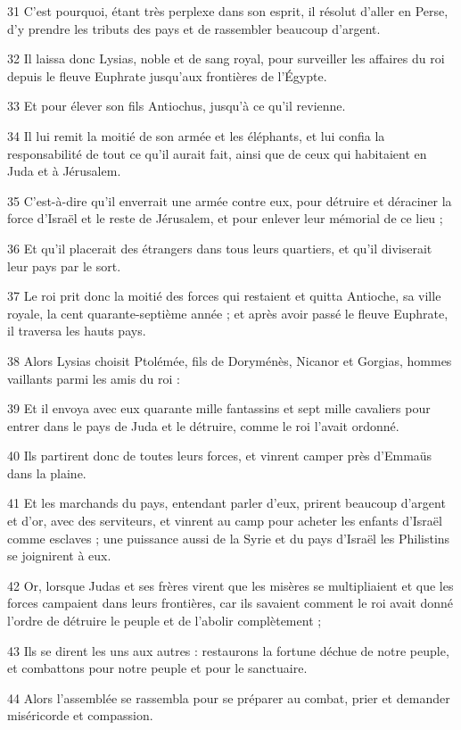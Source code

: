 \par 31 C'est pourquoi, étant très perplexe dans son esprit, il résolut d'aller en Perse, d'y prendre les tributs des pays et de rassembler beaucoup d'argent.
\par 32 Il laissa donc Lysias, noble et de sang royal, pour surveiller les affaires du roi depuis le fleuve Euphrate jusqu'aux frontières de l'Égypte.
\par 33 Et pour élever son fils Antiochus, jusqu'à ce qu'il revienne.
\par 34 Il lui remit la moitié de son armée et les éléphants, et lui confia la responsabilité de tout ce qu'il aurait fait, ainsi que de ceux qui habitaient en Juda et à Jérusalem.
\par 35 C'est-à-dire qu'il enverrait une armée contre eux, pour détruire et déraciner la force d'Israël et le reste de Jérusalem, et pour enlever leur mémorial de ce lieu ;
\par 36 Et qu'il placerait des étrangers dans tous leurs quartiers, et qu'il diviserait leur pays par le sort.
\par 37 Le roi prit donc la moitié des forces qui restaient et quitta Antioche, sa ville royale, la cent quarante-septième année ; et après avoir passé le fleuve Euphrate, il traversa les hauts pays.
\par 38 Alors Lysias choisit Ptolémée, fils de Doryménès, Nicanor et Gorgias, hommes vaillants parmi les amis du roi :
\par 39 Et il envoya avec eux quarante mille fantassins et sept mille cavaliers pour entrer dans le pays de Juda et le détruire, comme le roi l'avait ordonné.
\par 40 Ils partirent donc de toutes leurs forces, et vinrent camper près d'Emmaüs dans la plaine.
\par 41 Et les marchands du pays, entendant parler d'eux, prirent beaucoup d'argent et d'or, avec des serviteurs, et vinrent au camp pour acheter les enfants d'Israël comme esclaves ; une puissance aussi de la Syrie et du pays d'Israël les Philistins se joignirent à eux.
\par 42 Or, lorsque Judas et ses frères virent que les misères se multipliaient et que les forces campaient dans leurs frontières, car ils savaient comment le roi avait donné l'ordre de détruire le peuple et de l'abolir complètement ;
\par 43 Ils se dirent les uns aux autres : restaurons la fortune déchue de notre peuple, et combattons pour notre peuple et pour le sanctuaire.
\par 44 Alors l'assemblée se rassembla pour se préparer au combat, prier et demander miséricorde et compassion.
